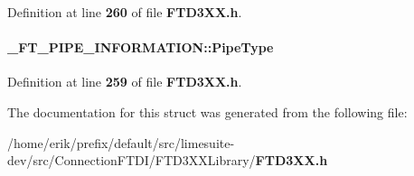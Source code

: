 Definition at line {\bf 260} of file {\bf F\+T\+D3\+X\+X.\+h}.

\paragraph[{Pipe\+Type}]{ \+\_\+\+F\+T\+\_\+\+P\+I\+P\+E\+\_\+\+I\+N\+F\+O\+R\+M\+A\+T\+I\+O\+N\+::\+Pipe\+Type}\label{struct__FT__PIPE__INFORMATION_a44c105b11a28c7b1a8663302fe5cc05e}


Definition at line {\bf 259} of file {\bf F\+T\+D3\+X\+X.\+h}.



The documentation for this struct was generated from the following file\+:\begin{DoxyCompactItemize}
\item 
/home/erik/prefix/default/src/limesuite-\/dev/src/\+Connection\+F\+T\+D\+I/\+F\+T\+D3\+X\+X\+Library/{\bf F\+T\+D3\+X\+X.\+h}\end{DoxyCompactItemize}
